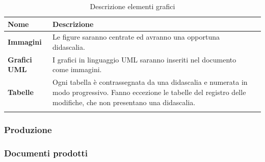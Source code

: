 {{	\setlength{\freewidth}{\dimexpr\textwidth-1\tabcolsep}
	\renewcommand{\arraystretch}{1.5}
	\setlength{\aboverulesep}{0pt}
	\setlength{\belowrulesep}{0pt}
	\begin{longtable}{L{.2\freewidth} L{.6\freewidth} L{.080\freewidth}}
		\textbf{Nome} & \textbf{Descrizione} \\
		\toprule
		\endhead		
		 \textbf{Immagini} & Le figure saranno centrate ed avranno una opportuna didascalia. \\
		  \textbf{Grafici UML} & I grafici in linguaggio UML saranno inseriti nel documento come immagini. \\
		  \textbf{Tabelle} & Ogni tabella è contrassegnata da una didascalia e numerata in modo progressivo. Fanno eccezione le tabelle del registro delle modifiche, che non presentano una didascalia. \\
		 

		\bottomrule
		\hiderowcolors
		\caption{Descrizione elementi grafici}
	\end{longtable}
	
\subsubsection{Produzione}	

\subsubsection*{Documenti prodotti \hfil}

}}

